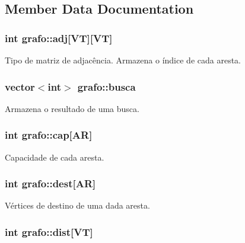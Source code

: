 \subsection{Member Data Documentation}
\hypertarget{structgrafo_a88380f36b7398a523a785c6f44739763}{
\subsubsection[{adj}]{\setlength{\rightskip}{0pt plus 5cm}int {\bf grafo::adj}\mbox{[}{\bf VT}\mbox{]}\mbox{[}{\bf VT}\mbox{]}}}
\label{structgrafo_a88380f36b7398a523a785c6f44739763}
Tipo de matriz de adjacência. Armazena o índice de cada aresta. \hypertarget{structgrafo_a611d95f6a3ae0587b52af7cfb9194dd8}{
\subsubsection[{busca}]{\setlength{\rightskip}{0pt plus 5cm}vector$<$int$>$ {\bf grafo::busca}}}
\label{structgrafo_a611d95f6a3ae0587b52af7cfb9194dd8}
Armazena o resultado de uma busca. \hypertarget{structgrafo_a184d92c96da2626c210fa357ec8074d1}{
\subsubsection[{cap}]{\setlength{\rightskip}{0pt plus 5cm}int {\bf grafo::cap}\mbox{[}{\bf AR}\mbox{]}}}
\label{structgrafo_a184d92c96da2626c210fa357ec8074d1}
Capacidade de cada aresta. \hypertarget{structgrafo_a6751e45609f4a149777b66dd5ff96500}{
\subsubsection[{dest}]{\setlength{\rightskip}{0pt plus 5cm}int {\bf grafo::dest}\mbox{[}{\bf AR}\mbox{]}}}
\label{structgrafo_a6751e45609f4a149777b66dd5ff96500}
Vértices de destino de uma dada aresta. \hypertarget{structgrafo_ac6986319622a1a15a63942a3648ec56d}{
\subsubsection[{dist}]{\setlength{\rightskip}{0pt plus 5cm}int {\bf grafo::dist}\mbox{[}{\bf VT}\mbox{]}}}
\label{structgrafo_ac6986319622a1a15a63942a3648ec56d}
